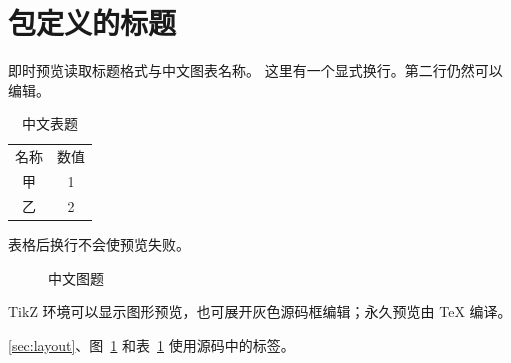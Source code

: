 \documentclass{article}
\begin{document}
\section{包定义的标题}\label{sec:layout}
即时预览读取标题格式与中文图表名称。
这里有一个显式换行。\newline 第二行仍然可以编辑。
\begin{table}[ht]
\centering
\begin{tabular}{cc}名称&数值\\甲&1\\乙&2\end{tabular}
\caption{中文表题}\label{tab:layout}
\end{table}\newline
表格后换行不会使预览失败。

\begin{figure}[ht]
\centering
{}
\caption{中文图题}\label{fig:layout}
\end{figure}
TikZ 环境可以显示图形预览，也可展开灰色源码框编辑；永久预览由 \TeX{} 编译。

\autoref{sec:layout}、图~\ref{fig:layout} 和表~\ref{tab:layout} 使用源码中的标签。
\end{document}
